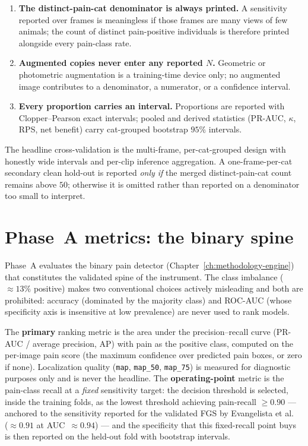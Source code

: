 \begin{enumerate}
  \item \textbf{The distinct-pain-cat denominator is always printed.} A sensitivity reported
        over frames is meaningless if those frames are many views of few animals; the count of
        distinct pain-positive individuals is therefore printed alongside every pain-class rate.
  \item \textbf{Augmented copies never enter any reported $N$.} Geometric or photometric
        augmentation is a training-time device only; no augmented image contributes to a
        denominator, a numerator, or a confidence interval.
  \item \textbf{Every proportion carries an interval.} Proportions are reported with
        Clopper--Pearson exact intervals; pooled and derived statistics (PR-AUC, $\kappa$,
        RPS, net benefit) carry cat-grouped bootstrap $95\%$ intervals.
\end{enumerate}

The headline cross-validation is the multi-frame, per-cat-grouped design with honestly wide
intervals and per-clip inference aggregation. A one-frame-per-cat secondary clean hold-out is
reported \emph{only if} the merged distinct-pain-cat count remains above $50$; otherwise it is
omitted rather than reported on a denominator too small to interpret.

\section{Phase~A metrics: the binary spine}
\label{sec:phaseA-metrics}

Phase~A evaluates the binary pain detector (Chapter~\ref{ch:methodology-engine}) that constitutes
the validated spine of the instrument. The class imbalance ($\approx 13\%$ positive) makes
two conventional choices actively misleading and both are prohibited: accuracy (dominated by
the majority class) and ROC-AUC (whose specificity axis is insensitive at low prevalence) are
never used to rank models.

The \textbf{primary} ranking metric is the area under the precision--recall curve
(PR-AUC / average precision, AP) with pain as the positive class, computed on the per-image
pain score (the maximum confidence over predicted pain boxes, or zero if none). Localization
quality (\texttt{map}, \texttt{map\_50}, \texttt{map\_75}) is measured for diagnostic purposes
only and is never the headline. The \textbf{operating-point} metric is the pain-class recall
at a \emph{fixed} sensitivity target: the decision threshold is selected, inside the training
folds, as the lowest threshold achieving pain-recall $\geq 0.90$ --- anchored to the
sensitivity reported for the validated FGS by Evangelista et al.~\cite{evangelista2019}
($\approx 0.91$ at AUC~$\approx 0.94$) --- and the specificity that this fixed-recall point buys is then reported
on the held-out fold with bootstrap intervals.

